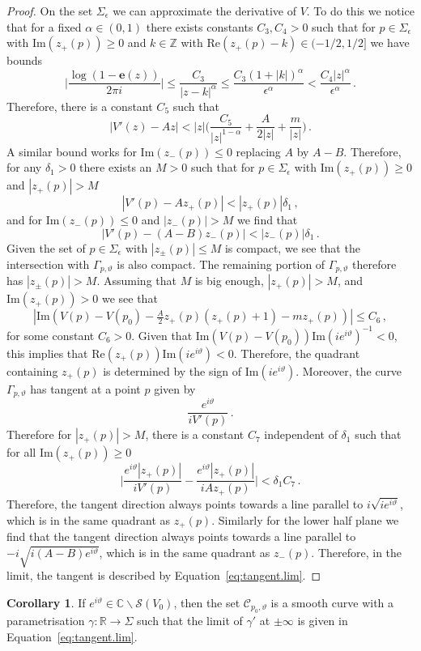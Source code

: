 \documentclass[12pt,reqno]{amsart}
\theoremstyle{definition}
\newtheorem{corollary}[theorem]{Corollary}
\def\BZ{\mathbb Z}
\def\BR{\mathbb R}
\def\BC{\mathbb C}
\def\Re{\mathrm{Re}}
\def\Im{\mathrm{Im}}
\def\be{\begin{equation}}
\def\ee{\end{equation}}
\def\e{\mathbf e}
\renewcommand{\=}{\;=\;}
\begin{document}
\begin{proof}
On the set $\Sigma_{\epsilon}$ we can approximate the derivative of $V$. To do this we notice that for a fixed $\alpha\in(0,1)$ there exists constants $C_{3},C_{4}>0$ such that for $p\in\Sigma_{\epsilon}$ with $\Im(z_{+}(p))\geq0$ and $k\in\BZ$ with $\Re(z_+(p)-k)\in(-1/2, 1/2]$ we have bounds
\be
  \Big|\frac{\log(1-\e(z))}{2\pi i}\Big|
  \leq
  \frac{C_{3}}{|z-k|^{\alpha}}
  \leq
  \frac{C_{3}(1+|k|)^{\alpha}}{\epsilon^{\alpha}}
  <\frac{C_{4}|z|^{\alpha}}{\epsilon^{\alpha}}\,.
\ee
Therefore, there is a constant $C_{5}$ such that
\be
  |V'(z)-Az|
  <
  |z|\Big(\frac{C_{5}}{|z|^{1-\alpha}}+\frac{A}{2|z|}+\frac{m}{|z|}\Big)\,.
\ee
A similar bound works for $\Im(z_-(p))\leq 0$ replacing $A$ by $A-B$. Therefore, for any $\delta_1>0$ there exists an $M>0$ such that for $p\in\Sigma_{\epsilon}$ with $\Im(z_+(p))\geq0$ and $|z_+(p)|>M$ 
\be
  |V'(p)-Az_+(p)|<|z_+(p)|\delta_1\,,
\ee
and for $\Im(z_-(p))\leq0$ and $|z_-(p)|>M$ we find that
\be
  |V'(p)-(A-B)z_-(p)|<|z_-(p)|\delta_1\,.
\ee
Given the set of $p\in\Sigma_{\epsilon}$ with $|z_{\pm}(p)|\leq M$ is compact, we see that the intersection with $\Gamma_{p,\vartheta}$ is also compact. The remaining portion of $\Gamma_{p,\vartheta}$ therefore has $|z_\pm(p)|>M$. Assuming that $M$ is big enough, $|z_+(p)|>M$, and $\Im(z_+(p))>0$ we see that
\be
  |\Im(V(p)-V(p_0)-\tfrac{A}{2}z_+(p)(z_+(p)+1)-mz_+(p))|
  \leq
  C_{6}\,,
\ee
for some constant $C_6>0$.
Given that $\Im(V(p)-V(p_0))\Im(i e^{i\vartheta})^{-1}<0$, this implies that $\Re(z_+(p))\Im(i e^{i\vartheta})<0$. Therefore, the quadrant containing $z_+(p)$ is determined by the sign of $\Im(i e^{i\vartheta})$. Moreover, the curve $\Gamma_{p,\vartheta}$ has tangent at a point $p$ given by
\be\label{eq:tangent-GGamma_p}
  \frac{ e^{i\vartheta}}{iV'(p)}\,.
\ee
Therefore for $|z_+(p)|>M$, there is a constant $C_{7}$ independent of $\delta_1$ such that for all $\Im(z_+(p))\geq 0$
\be\label{eq:tangent-outside-ball}
  \Big|\frac{e^{i\vartheta}|z_+(p)|}{i V'(p)}-\frac{e^{i\vartheta}|z_+(p)|}{i Az_+(p)}\Big|
  <\delta_1C_7\,.
\ee
Therefore, the tangent direction always points towards a line parallel to $i\sqrt{i e^{i\vartheta}}$, which is in the same quadrant as $z_+(p)$. Similarly for the lower half plane we find that the tangent direction always points towards a line parallel to $-i\sqrt{i(A-B) e^{i\vartheta}}$, which is in the same quadrant as $z_-(p)$. Therefore, in the limit, the tangent is described by Equation~\eqref{eq:tangent.lim}.
\end{proof}
\begin{corollary}\label{cor:thimble}
If $e^{i\vartheta}\in\BC\backslash\mathcal{S}(V_{0})$, then the set $\mathcal{C}_{p_0,\vartheta}$ is a smooth curve with a parametrisation $\gamma:\BR\rightarrow\Sigma$ such that the limit of $\gamma'$ at $\pm\infty$ is given in Equation~\eqref{eq:tangent.lim}.
\end{corollary}
\end{document}
